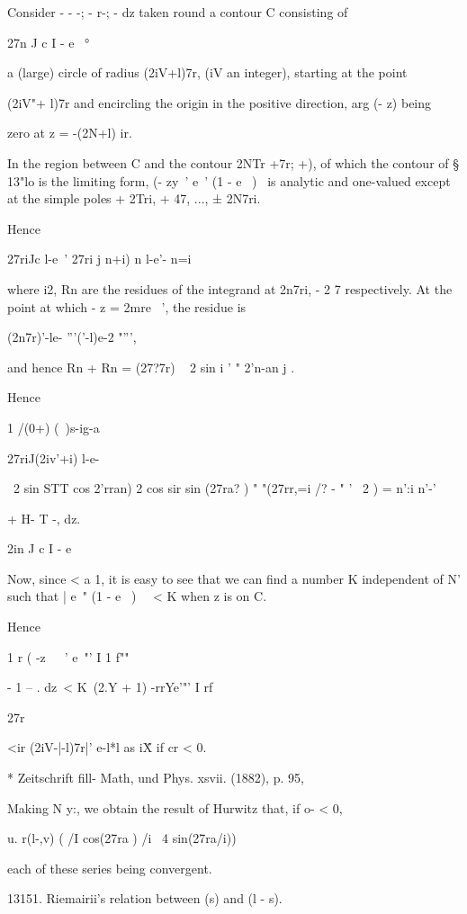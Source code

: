 Consider - - -; - r-; - dz taken round a contour C consisting of

27n J c I - e~ °

a (large) circle of radius (2iV+l)7r, (iV an integer), starting at the
point

(2iV"+ l)7r and encircling the origin in the positive direction, arg
(- z) being

zero at z = -(2N+l) ir.

In the region between C and the contour 2NTr +7r; +), of which the
contour of § 13"lo is the limiting form, (- zy~' e~' (1 - e~ )~ is
analytic and one-valued except at the simple poles + 2Tri, + 47, ...,
± 2N7ri.

Hence

27riJc l-e~' 27ri j n+i) n l-e'- n=i

where i2, Rn are the residues of the integrand at 2n7ri, - 2 7
respectively. At the point at which - z = 2mre~ ', the residue is

(2n7r)'-le- '''('-l)e-2 "''',

and hence Rn + Rn = (27?7r) ~ 2 sin i ' " 2'n-an j .

Hence

1 /(0+) (\ )s-ig-a

27riJ(2iv'+i) l-e-

\ 2 sin STT cos 2'rran) 2 cos sir sin (27ra? ) " "(27rr,=i /? - " ' \
2 ) = n':i n'-'

+ H-  T -, dz.

2in J c I - e

Now, since < a 1, it is easy to see that we can find a number K
independent of N' such that | e~" (1 - e~ )~ \ < K when z is on C.

Hence

1 r ( -z\ \ ~' e~"' I 1 f""

-  1 -- . dz\ < K\, (2.Y + 1) -rrYe'"' I rf

27r

<ir (2iV-|-l)7r|' e-l*l as i\" X if cr < 0.

* Zeitschrift fill- Math, und Phys. xsvii. (1882), p. 95,

%
%

Making N y:, we obtain the result of Hurwitz that, if o- < 0,

 u. r(l-,v) ( /I cos(27ra ) /i \ 4 sin(27ra/i))

each of these series being convergent.

13151. Riemairii's relation between (s) and (l - s).

